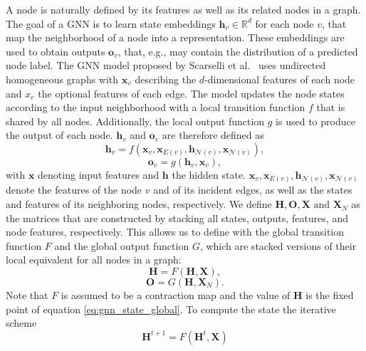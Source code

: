 A node is naturally defined by its features as well as its related nodes in a graph. The goal of a GNN is to learn state embeddings $\mathbf{h}_v \in \mathbb{R}^d$ for each node $v$, that map the neighborhood of a node into a representation. These embeddings are used to obtain outputs $\mathbf{o}_v$, that, e.g., may contain the distribution of a predicted node label. The GNN model proposed by Scarselli et al.~\cite{4700287} uses undirected homogeneous graphs with $\mathbf{x}_v$ describing the $d$-dimensional features of each node and $x_e$ the optional features of each edge. The model updates the node states according to the input neighborhood with a local transition function $f$ that is shared by all nodes. Additionally, the local output function $g$ is used to produce the output of each node. $\mathbf{h}_v$ and $\mathbf{o}_v$ are therefore defined as
\begin{equation}
    \mathbf{h}_v = f(\mathbf{x}_v, \mathbf{x}_{E(v)}, \mathbf{h}_{\mathcal{N}(v)}, \mathbf{x}_{\mathcal{N}(v)}),
    \label{eq:gnn_state_local}
\end{equation}
\begin{equation}
    \mathbf{o}_v = g(\mathbf{h}_v, \mathbf{x}_v),
\end{equation}
with $\mathbf{x}$ denoting input features and $\mathbf{h}$ the hidden state. $\mathbf{x}_v, \mathbf{x}_{E(v)}, \mathbf{h}_{\mathcal{N}(v)}, \mathbf{x}_{\mathcal{N}(v)}$ denote the features of the node $v$ and of its incident edges, as well as the states and features of its neighboring nodes, respectively. We define $\mathbf{H}, \mathbf{O}, \mathbf{X} \text{ and  }\mathbf{X}_N$ as the matrices that are constructed by stacking all states, outputs, features, and node features, respectively. This allows us to define with the global transition function $F$ and the global output function $G$, which are stacked versions of their local equivalent for all nodes in a graph: 
\begin{equation}
    \mathbf{H} = F(\mathbf{H}, \mathbf{X}),
    \label{eq:gnn_state_global}
\end{equation}
\begin{equation}
    \mathbf{O} = G(\mathbf{H},\mathbf{X}_N).
\end{equation}
Note that $F$ is assumed to be a contraction map and the value of $\mathbf{H}$ is the fixed point of equation \eqref{eq:gnn_state_global}. To compute the state the iterative scheme
\begin{equation}
    \label{eq:GNN_iterations}
    \mathbf{H}^{t+1} = F(\mathbf{H}^{t}, \mathbf{X})
\end{equation}

